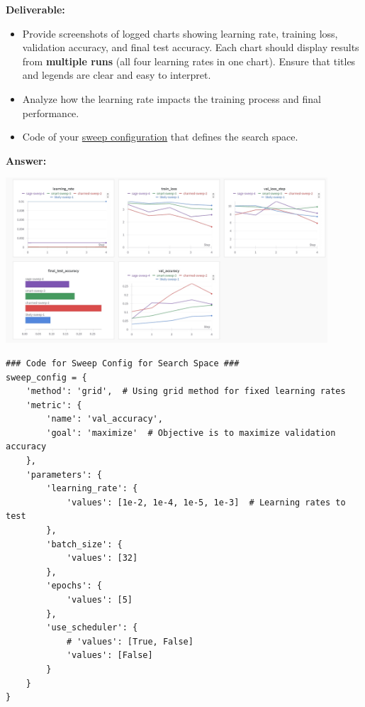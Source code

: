 \documentclass[11pt, oneside]{article}   	%
\begin{document}
\noindent\textbf{Deliverable:}
\begin{itemize}
    \item Provide screenshots of logged charts showing learning rate, training loss, validation accuracy, and final test accuracy. Each chart should display results from \textbf{multiple runs} (all four learning rates in one chart). Ensure that titles and legends are clear and easy to interpret.
    \item Analyze how the learning rate impacts the training process and final performance.
    \item Code of your \href{https://docs.wandb.ai/guides/sweeps/define-sweep-configuration}{sweep configuration} that defines the search space.
\end{itemize}

\textbf{Answer:} \\
\begin{center}
    \includegraphics[width=0.9\textwidth]{report_pic/SweepChart1.png}
\end{center}

\begin{verbatim}
### Code for Sweep Config for Search Space ###
sweep_config = {
    'method': 'grid',  # Using grid method for fixed learning rates
    'metric': {
        'name': 'val_accuracy',
        'goal': 'maximize'  # Objective is to maximize validation accuracy
    },
    'parameters': {
        'learning_rate': {
            'values': [1e-2, 1e-4, 1e-5, 1e-3]  # Learning rates to test
        },
        'batch_size': {
            'values': [32]
        },
        'epochs': {
            'values': [5]
        },
        'use_scheduler': {
            # 'values': [True, False]
            'values': [False]
        }
    }
}
\end{verbatim}
\end{document}
